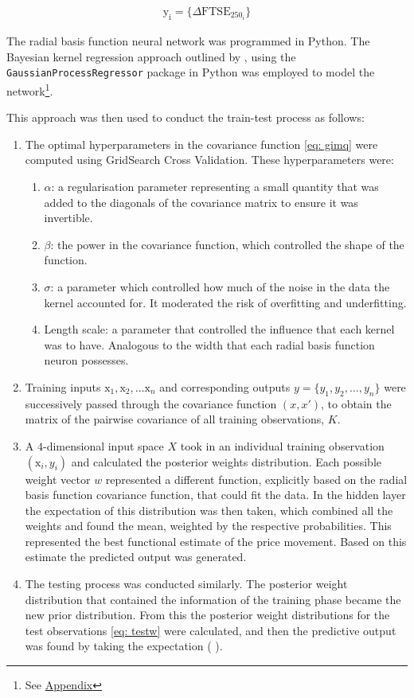 \documentclass[11pt,a4paper]{article}
\newcommand{\citeboth}[1]{\citeauthor{#1} \citep{#1}}
\begin{document}
\begin{align}
    \boldsymbol{\mathrm{y_i}} = \{\Delta \text{FTSE}_{250_i}\}
\end{align}

The radial basis function neural network was programmed in Python. The Bayesian kernel regression approach outlined by 
\citeboth{bishop1995}, using the \texttt{GaussianProcessRegressor} package in Python was employed to model the network\footnote{See \hyperref[sec: appendix]{Appendix}}. 

This approach was then used to conduct the train-test process as follows:
\begin{enumerate}
    \item The optimal hyperparameters in the covariance function \eqref{eq: gimq} 
    were computed using GridSearch Cross Validation. These hyperparameters were:
    \begin{enumerate}
        \item $\alpha$: a regularisation parameter representing a small quantity
        that was added to the diagonals of the covariance matrix to ensure it was 
        invertible. 
        \item $\beta$: the power in the covariance function, which controlled the shape of the function.
        \item $\sigma$: a parameter which controlled how much of the noise in the data the kernel accounted for. It moderated the risk of overfitting and underfitting.
        \item Length scale: a parameter that controlled the influence that each kernel was to have. Analogous to 
        the width that each radial basis function neuron possesses.
    \end{enumerate}
    \item Training inputs $\boldsymbol{\mathrm{x}}_1, \boldsymbol{\mathrm{x}}_2,\ldots \boldsymbol{\mathrm{x}}_{n}$
    and corresponding outputs \( y = \{y_1, y_2, \dots, y_n\} \) were successively passed through the 
    covariance function $(x,x')$, to obtain the matrix of the pairwise covariance of 
    all training observations, $K$.
    \item A $4$-dimensional input space $X$ took in an individual training observation $(\boldsymbol{\mathrm{x}}_{i}, y_i)$ and 
    calculated the posterior weights distribution. 
    Each possible weight vector $w$ represented a different function, explicitly 
    based on the radial basis function covariance function, that could fit the data. In the 
    hidden layer the expectation of this distribution was then taken, which
    combined all the weights and found the mean, weighted by the 
    respective probabilities. This represented the best functional estimate of the price movement. Based on this estimate 
    the predicted output was generated.
    \item The testing process was conducted similarly. The 
    posterior weight distribution that contained the information of the training phase became the new 
    prior distribution. From this the posterior weight distributions for the test observations \eqref{eq: testw}
    were calculated, and then the predictive output was found by taking the expectation (\citeboth{rasmussen2006}).
    

\end{enumerate}
\end{document}
